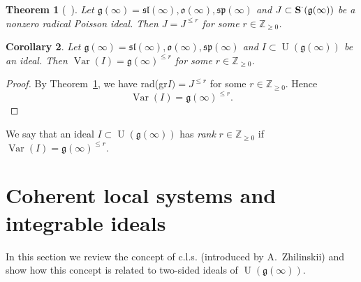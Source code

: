 \documentclass{emsprocart}
\newtheorem{theorem}{Theorem}[section]
\newtheorem{corollary}[theorem]{Corollary}
\begin{document}
\begin{theorem}[{~\cite[Theorem 3.3]{PP1}}]\label{Tlinfrk}Let $\mathfrak g(\infty)=\mathfrak{sl}(\infty), \mathfrak{o}(\infty), \mathfrak{sp}(\infty)$ and $J\subset\operatorname{\bf S}^\cdot(\mathfrak g(\infty))$ be a nonzero radical Poisson ideal. Then $J=J^{\le r}$ for some $r\in\mathbb Z_{\ge0}$.\end{theorem}
\begin{corollary} Let $\mathfrak g(\infty)=\mathfrak{sl}(\infty), \mathfrak o(\infty), \mathfrak{sp}(\infty)$ and $I\subset\operatorname{U}(\mathfrak g(\infty))$ be an ideal. Then $\operatorname{Var}(I)=\mathfrak g(\infty)^{\le r}$ for some $r\in\mathbb Z_{\ge0}$.\end{corollary}
\begin{proof} By Theorem~\ref{Tlinfrk}, we have rad(gr$I)=J^{\le r }$ for some $r\in\mathbb Z_{\ge0}$. Hence $$\operatorname{Var}(I)=\mathfrak g(\infty)^{\le r}.$$\end{proof}
We say that an ideal $I\subset\operatorname{U}(\mathfrak g(\infty))$ has {\it rank} $r\in\mathbb Z_{\ge0}$ if $\operatorname{Var}(I)=\mathfrak g(\infty)^{\le r}$.



\section{Coherent local systems and integrable ideals}\label{Sclsint}
In this section we review the concept of c.l.s. (introduced by A.~Zhilinskii) and show how this concept is related to two-sided ideals of $\operatorname{U}(\mathfrak g(\infty))$.
\end{document}
